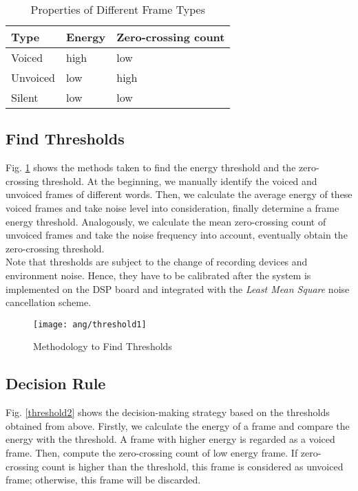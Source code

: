 \begin{table}[H]
\centering
\caption{Properties of Different Frame Types}
\label{table:thresholds}
\begin{tabu} to 0.8\textwidth {XXX}
\toprule
Type &Energy &Zero-crossing count\\
\hline
Voiced &high &low\\
\hline
Unvoiced &low &high\\
\hline
Silent &low &low\\
\bottomrule
\end{tabu}
\end{table}


\subsection{Find Thresholds}

Fig. \ref{threshold1} shows the methods taken to find the energy threshold and the zero-crossing threshold. At the beginning, we manually identify the voiced and unvoiced frames of different words. Then, we calculate the average energy of these voiced frames and take noise level into consideration, finally determine a frame energy threshold. Analogously, we calculate the mean zero-crossing count of unvoiced frames and take the noise frequency into account, eventually obtain the zero-crossing threshold.\\

Note that thresholds are subject to the change of recording devices and environment noise. Hence, they have to be calibrated after the system is implemented on the DSP board and integrated with the \textit{Least Mean Square} noise cancellation scheme.

\begin{figure}[H]
\centering
\texttt{[image: ang/threshold1]}
\caption{Methodology to Find Thresholds}
\label{threshold1}
\end{figure}


\subsection{Decision Rule}

Fig. \ref{threshold2} shows the decision-making strategy based on the thresholds obtained from above. Firstly, we calculate the energy of a frame and compare the energy with the threshold. A frame with higher energy is regarded as a voiced frame. Then, compute the zero-crossing count of low energy frame. If zero-crossing count is higher than the threshold, this frame is considered as unvoiced frame; otherwise, this frame will be discarded.

